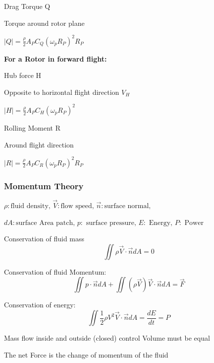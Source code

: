 \documentclass[fontsize=6pt,DIV=calc,a4paper,ngerman]{scrartcl}
\begin{document}
\begin{multicols*}{4}
\begin{minipage}{0.45\linewidth}
	\end{minipage}\hfill
	\begin{minipage}{0.5\linewidth}
		Drag Torque Q

		\smallskip
		Torque around rotor plane

		\smallskip
		$|Q|=\frac{\rho}{2}A_PC_Q(\omega_pR_P)^2R_P$

	\end{minipage}

	\medskip
	\textbf{For a Rotor in forward flight:}

	\begin{minipage}{0.45\linewidth}
		Hub force H

		\smallskip
		Opposite to horizontal flight direction $V_H$

		\smallskip
		$|H|= \frac{\rho}{2}A_PC_H(\omega_pR_P)^2$
	\end{minipage}\hfill
	\begin{minipage}{0.5\linewidth}
		Rolling Moment R

		\smallskip
		Around flight direction

		\smallskip
		$|R|= \frac{\rho}{2}A_PC_R(\omega_pR_P)^2R_P$
	\end{minipage}


	\subsubsection{Momentum Theory}
	{\small
		$\rho:\text{fluid density, }\vec{V}:\text{flow speed, } \vec{n}: \text{surface normal, }$

		$dA: \text{surface Area patch, } p: \text{ surface pressure, } E: \text{ Energy, } P: \text{ Power}$
	}

	\smallskip
	\begin{minipage}{0.6\linewidth}
		Conservation of fluid mass
		$$\displaystyle \iint \rho\vec{V}\cdot \vec{n}dA = 0 $$

		Conservation of fluid Momentum:
		$$\displaystyle \iint p\cdot \vec{n}dA+\iint (\rho\vec{V})\vec{V}\cdot \vec{n}dA = \vec{F} $$

		Conservation of energy:
		$$\displaystyle \iint\frac{1}{2}\rho V^2\vec{V}\cdot \vec{n}dA=\frac{dE}{dt}=P$$

	\end{minipage}\hfill
	\begin{minipage}{0.38\linewidth}
		Mass flow inside and outside (closed) control Volume must be equal

		\bigskip
		The net Force is the change of momentum of the fluid


\end{minipage}
\end{multicols*}
\end{document}
